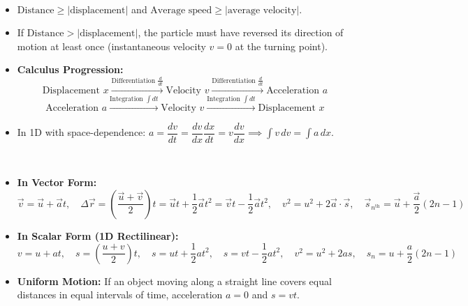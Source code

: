 \documentclass[11pt,a4paper]{article}
\begin{document}
\vspace{5pt}
\noindent{\large\textbf{\textsf{\textcolor{primaryDark}{2.3 Fundamental Rules of 1D Motion}}}}\\[3pt]
\begin{itemize}[leftmargin=14pt,itemsep=1pt]
  \item $\text{Distance} \ge |\text{displacement}|$ and $\text{Average speed} \ge |\text{average velocity}|$.
  \item If $\text{Distance} > |\text{displacement}|$, the particle must have reversed its direction of motion at least once (instantaneous velocity $v = 0$ at the turning point).
  \item \textbf{Calculus Progression:}
  \[
    \text{Displacement } x \xrightarrow{\text{Differentiation } \frac{d}{dt}} \text{Velocity } v \xrightarrow{\text{Differentiation } \frac{d}{dt}} \text{Acceleration } a
  \]
  \[
    \text{Acceleration } a \xrightarrow{\text{Integration } \int dt} \text{Velocity } v \xrightarrow{\text{Integration } \int dt} \text{Displacement } x
  \]
  \item In 1D with space-dependence: $a = \dfrac{dv}{dt} = \dfrac{dv}{dx}\dfrac{dx}{dt} = v\dfrac{dv}{dx} \implies \int v\,dv = \int a\,dx$.
\end{itemize}

\vspace{5pt}
\noindent{\large\textbf{\textsf{\textcolor{primaryDark}{2.4 Equations of Motion (Constant Acceleration)}}}}\\[3pt]
\begin{itemize}[leftmargin=14pt,itemsep=1pt]
  \item \textbf{In Vector Form:}
  \[
    \vec{v} = \vec{u} + \vec{a}t, \quad \Delta \vec{r} = \left(\frac{\vec{u}+\vec{v}}{2}\right)t = \vec{u}t + \frac{1}{2}\vec{a}t^2 = \vec{v}t - \frac{1}{2}\vec{a}t^2, \quad v^2 = u^2 + 2\vec{a}\cdot\vec{s}, \quad \vec{s}_{n^{\text{th}}} = \vec{u} + \frac{\vec{a}}{2}(2n - 1)
  \]
  \item \textbf{In Scalar Form (1D Rectilinear):}
  \[
    v = u + at, \quad s = \left(\frac{u+v}{2}\right)t, \quad s = ut + \frac{1}{2}at^2, \quad s = vt - \frac{1}{2}at^2, \quad v^2 = u^2 + 2as, \quad s_n = u + \frac{a}{2}(2n - 1)
  \]
  \item \textbf{Uniform Motion:} If an object moving along a straight line covers equal distances in equal intervals of time, acceleration $a = 0$ and $s = vt$.
\end{itemize}
\end{document}
